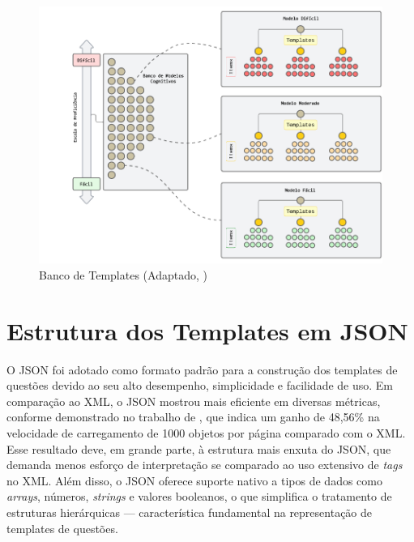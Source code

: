 \begin{figure}[ht]
	\centering
	\includegraphics[width=14cm]{./imagens/capitulo5/proficiency-scale-named}
	\caption{Banco de Templates (Adaptado, \cite{hendrickson2010}) }
	\label{fig:proficiency-scale}
\end{figure}

\section{Estrutura dos Templates em JSON}

O JSON foi adotado como formato padrão para a construção dos templates de questões devido ao seu alto desempenho, simplicidade e facilidade de uso. Em comparação ao XML, o JSON mostrou mais eficiente em diversas métricas, conforme demonstrado no trabalho de \parencite{wang2011}, que indica um ganho de  48,56\% na velocidade de carregamento de 1000 objetos por página comparado com o XML. Esse resultado deve, em grande parte, à estrutura mais enxuta do JSON, que demanda menos esforço de interpretação se comparado ao uso extensivo de \textit{tags} no XML.  Além disso, o JSON oferece suporte nativo a tipos de dados como \textit{arrays}, números, \textit{strings} e valores booleanos, o que simplifica o tratamento de estruturas hierárquicas — característica fundamental na representação de templates de questões.

